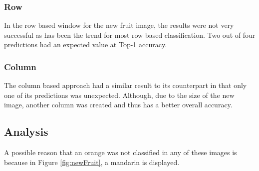 \tocless\subsubsection{Row}
In the row based window for the new fruit image, the results were not very
successful as has been the trend for most row based classification. Two out of
four predictions had an expected value at Top-1 accuracy.

\tocless\subsubsection{Column}
The column based approach had a similar result to its counterpart in that only
one of its predictions was unexpected. Although, due  to the size of the new
image, another column was created and thus has a better overall accuracy.

\tocless\subsection{Analysis}
A possible reason that an orange was not classified in any of these images is
because in Figure \ref{fig:newFruit}, a mandarin is displayed.
